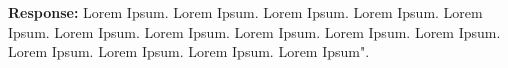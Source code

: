 \documentclass[10pt,journal,compsoc]{IEEEtran}
\begin{document}
\noindent
{\bf Response:}
Lorem Ipsum. Lorem Ipsum. Lorem Ipsum. Lorem Ipsum.
Lorem Ipsum. Lorem Ipsum. Lorem Ipsum. Lorem Ipsum.
Lorem Ipsum. Lorem Ipsum. Lorem Ipsum. Lorem Ipsum.
Lorem Ipsum. Lorem Ipsum".\\



\end{document}
